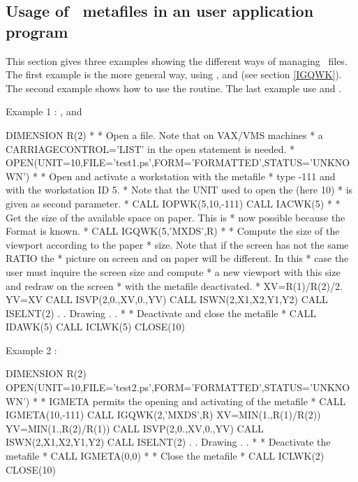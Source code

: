 \subsection{Usage of \PS~metafiles in an user application program}
This section gives three examples showing the different ways of managing
\PS~files. The first example is the more general way, using
,  and  (see section \ref{IGQWK}). The
second example shows how to use the  routine. The last example
use  and .
\begin{XMPt}{Example 1 : ,  and }

      DIMENSION R(2)
*
*              Open a \FORTRAN file. Note that on VAX/VMS machines
*              a CARRIAGECONTROL='LIST' in the open statement is needed.
*
      OPEN(UNIT=10,FILE='test1.ps',FORM='FORMATTED',STATUS='UNKNOWN')
*
*              Open and activate a workstation with the \PS metafile
*              type -111 and with the workstation ID 5.
*              Note that the UNIT used to open the \FORTRAN (here 10)
*              is given as second parameter.
*
      CALL IOPWK(5,10,-111)
      CALL IACWK(5)
*
*              Get the size of the available space on paper. This is
*              now possible because the Format is known.
*
      CALL IGQWK(5,'MXDS',R)
*
*              Compute the size of the viewport according to the paper
*              size. Note that if the screen has not the same RATIO the
*              picture on screen and on paper will be different. In this
*              case the user must inquire the screen size and compute
*              a new viewport with this size and redraw on the screen
*              with the metafile deactivated.
*
      XV=R(1)/R(2)/2.
      YV=XV
      CALL ISVP(2,0.,XV,0.,YV)
      CALL ISWN(2,X1,X2,Y1,Y2)
      CALL ISELNT(2)
          .
          .
        Drawing
          .
          .
*
*              Deactivate and close the metafile
*
      CALL IDAWK(5)
      CALL ICLWK(5)
      CLOSE(10)

\end{XMPt}
\begin{XMPt}{Example 2 : }

      DIMENSION R(2)
      OPEN(UNIT=10,FILE='test2.ps',FORM='FORMATTED',STATUS='UNKNOWN')
*
*              IGMETA permits the opening and activating of the metafile
*
      CALL IGMETA(10,-111)
      CALL IGQWK(2,'MXDS',R)
      XV=MIN(1.,R(1)/R(2))
      YV=MIN(1.,R(2)/R(1))
      CALL ISVP(2,0.,XV,0.,YV)
      CALL ISWN(2,X1,X2,Y1,Y2)
      CALL ISELNT(2)
          .
          .
        Drawing
          .
          .
*
*              Deactivate the metafile
*
      CALL IGMETA(0,0)
*
*              Close the metafile
*
      CALL ICLWK(2)
      CLOSE(10)

\end{XMPt}
